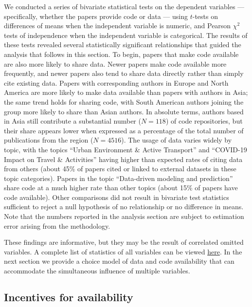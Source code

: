 \documentclass[
  authoryear,
  review,
  3p]{elsarticle}
\begin{document}
We conducted a series of bivariate statistical tests on the dependent
variables --- specifically, whether the papers provide code or data ---
using \(t\)-tests on differences of means when the independent variable
is numeric, and Pearson \(\chi^2\) tests of independence when the
independent variable is categorical. The results of these tests revealed
several statistically significant relationships that guided the analysis
that follows in this section. To begin, papers that make code available
are also more likely to share data. Newer papers make code available
more frequently, and newer papers also tend to share data directly
rather than simply cite existing data. Papers with corresponding authors
in Europe and North America are more likely to make data available than
papers with authors in Asia; the same trend holds for sharing code, with
South American authors joining the group more likely to share than Asian
authors. In absolute terms, authors based in Asia still contribute a
substantial number (\(N=118\)) of code repositories, but their share
appears lower when expressed as a percentage of the total number of
publications from the region (\(N=4516\)). The usage of data varies
widely by topic, with the topics ``Urban Environment \& Active
Transport'' and ``COVID-19 Impact on Travel \& Activities'' having
higher than expected rates of citing data from others (about 45\% of
papers cited or linked to external datasets in these topic categories).
Papers in the topic ``Data-driven modeling and prediction'' share code
at a much higher rate than other topics (about 15\% of papers have code
available). Other comparisons did not result in bivariate test
statistics sufficient to reject a null hypothesis of no relationship or
no difference in means. Note that the numbers reported in the analysis
section are subject to estimation error arising from the methodology.

These findings are informative, but they may be the result of correlated
omitted variables. A complete list of statistics of all variables can be
viewed
\href{https://019b33f2-34f4-9d17-cc65-86ffbaaa9028.share.connect.posit.cloud/}{here}.
In the next section we provide a choice model of data and code
availability that can accommodate the simultaneous influence of multiple
variables.

\subsection{Incentives for
availability}\label{incentives-for-availability}
\end{document}
